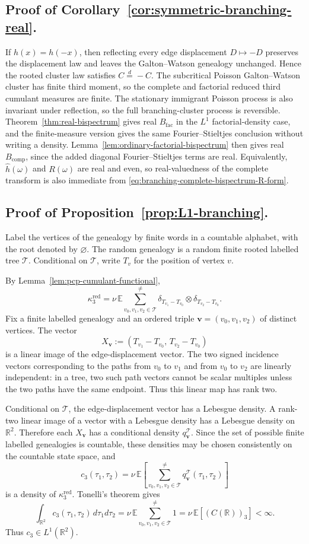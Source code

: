 \documentclass[aap,press]{apt} \volno{00} \partno{00}
\newcommand{\E}{\mathbb{E}}
\newcommand{\R}{\mathbb{R}}
\newcommand{\1}{\mathbf{1}}
\numberwithin{equation}{section}
\begin{document}
\subsection{Proof of Corollary~\ref{cor:symmetric-branching-real}.}
If $h(x)=h(-x)$, then reflecting every edge displacement $D\mapsto -D$ preserves the displacement law and leaves the Galton--Watson genealogy unchanged. Hence the rooted cluster law satisfies $C\stackrel d=-C$. The subcritical Poisson Galton--Watson cluster has finite third moment, so the complete and factorial reduced third cumulant measures are finite. The stationary immigrant Poisson process is also invariant under reflection, so the full branching-cluster process is reversible. Theorem~\ref{thm:real-bispectrum} gives real $B_{\mathrm{fac}}$ in the $L^1$ factorial-density case, and the finite-measure version gives the same Fourier--Stieltjes conclusion without writing a density. Lemma~\ref{lem:ordinary-factorial-bispectrum} then gives real $B_{\mathrm{comp}}$, since the added diagonal Fourier--Stieltjes terms are real. Equivalently, $\widehat h(\omega)$ and $R(\omega)$ are real and even, so real-valuedness of the complete transform is also immediate from \eqref{eq:branching-complete-bispectrum-R-form}.

\subsection{Proof of Proposition~\ref{prop:L1-branching}.}
Label the vertices of the genealogy by finite words in a countable alphabet, with the root denoted by $\varnothing$. The random genealogy is a random finite rooted labelled tree $\mathcal T$. Conditional on $\mathcal T$, write $T_v$ for the position of vertex $v$.

By Lemma~\ref{lem:pcp-cumulant-functional},
\[
\kappa_3^{\mathrm{red}}
=
\nu\,\E
\sum_{v_0,v_1,v_2\in\mathcal T}^{\neq}
\delta_{T_{v_1}-T_{v_0}}
\otimes
\delta_{T_{v_2}-T_{v_0}}.
\]
Fix a finite labelled genealogy and an ordered triple $\mathbf v=(v_0,v_1,v_2)$ of distinct vertices. The vector
\[
X_{\mathbf v}:=(T_{v_1}-T_{v_0},\,T_{v_2}-T_{v_0})
\]
is a linear image of the edge-displacement vector. The two signed incidence vectors corresponding to the paths from $v_0$ to $v_1$ and from $v_0$ to $v_2$ are linearly independent: in a tree, two such path vectors cannot be scalar multiples unless the two paths have the same endpoint. Thus this linear map has rank two.

Conditional on $\mathcal T$, the edge-displacement vector has a Lebesgue density. A rank-two linear image of a vector with a Lebesgue density has a Lebesgue density on $\R^2$. Therefore each $X_{\mathbf v}$ has a conditional density $q_{\mathbf v}^{\mathcal T}$. Since the set of possible finite labelled genealogies is countable, these densities may be chosen consistently on the countable state space, and
\[
c_3(\tau_1,\tau_2)
=
\nu\,\E\left[
\sum_{v_0,v_1,v_2\in\mathcal T}^{\neq}
q_{\mathbf v}^{\mathcal T}(\tau_1,\tau_2)
\right]
\]
is a density of $\kappa_3^{\mathrm{red}}$. Tonelli's theorem gives
\[
\int_{\R^2}c_3(\tau_1,\tau_2)\,d\tau_1d\tau_2
=
\nu\,\E\sum_{v_0,v_1,v_2\in\mathcal T}^{\neq}1
=
\nu\,\E[(C(\R))_3]<\infty.
\]
Thus $c_3\in L^1(\R^2)$.
\end{document}
